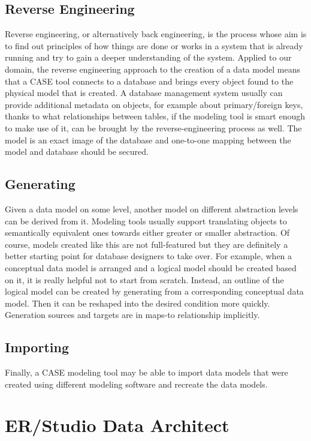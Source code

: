 \subsection{Reverse Engineering}
\label{data_model_reverse_engineering}
Reverse engineering, or alternatively back engineering, is the process whose aim is to find out principles of how things are done or works in a system that is already running and try to gain a deeper understanding of the system.
Applied to our domain, the reverse engineering approach to the creation of a data model means that a CASE tool connects to a database and brings every object found to the physical model that is created. A database management system usually can provide additional metadata on objects, for example about primary/foreign keys, thanks to what relationships between tables, if the modeling tool is smart enough to make use of it, can be brought by the reverse-engineering process as well.
The model is an exact image of the database and one-to-one mapping between the model and database should be secured.

\subsection{Generating}
\label{generating}
Given a data model on some level, another model on different abstraction levels can be derived from it. Modeling tools usually support translating objects to semantically equivalent ones towards either greater or smaller abstraction. Of course, models created like this are not full-featured but they are definitely a better starting point for database designers to take over. 
For example, when a conceptual data model is arranged and a logical model should be created based on it, it is really helpful not to start from scratch. Instead, an outline of the logical model can be created by generating from a corresponding conceptual data model. 
Then it can be reshaped into the desired condition more quickly. 
Generation sources and targets are in maps-to relationship implicitly.

\subsection{Importing}
Finally, a CASE modeling tool may be able to import data models that were created using different modeling software and recreate the data models.

\section{ER/Studio Data Architect}

